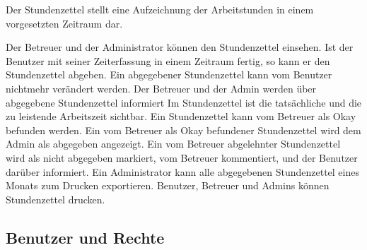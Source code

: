 \begin{requirements}
    Der Stundenzettel stellt eine Aufzeichnung der Arbeitstunden in einem vorgesetzten Zeitraum dar.
    \begin{requirements}
         Der Betreuer und der Administrator können den Stundenzettel einsehen.
         Ist der Benutzer mit seiner Zeiterfassung in einem Zeitraum fertig, so kann er den Stundenzettel abgeben.
         Ein abgegebener Stundenzettel kann vom Benutzer nichtmehr verändert werden.
         Der Betreuer und der Admin werden über abgegebene Stundenzettel informiert
         Im Stundenzettel ist die tatsächliche und die zu leistende Arbeitszeit sichtbar.
         Ein Stundenzettel kann vom Betreuer als Okay befunden werden.
         Ein vom Betreuer als Okay befundener Stundenzettel wird dem Admin als abgegeben angezeigt.
         Ein vom Betreuer abgelehnter Stundenzettel wird als nicht abgegeben markiert, vom Betreuer kommentiert, und der Benutzer darüber informiert.
         Ein Administrator kann alle abgegebenen Stundenzettel eines Monats zum Drucken exportieren.
        Benutzer, Betreuer und Admins können Stundenzettel drucken.
    \end{requirements}

\end{requirements}

\subsection{Benutzer und Rechte}

